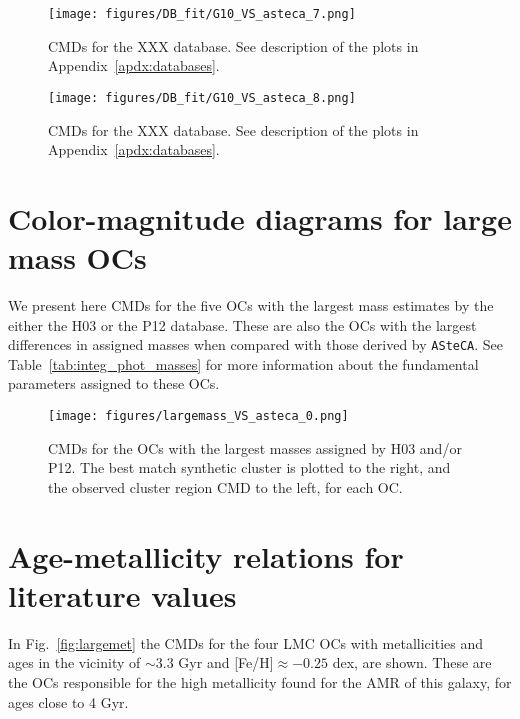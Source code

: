 \documentclass[a4paper,fleqn,usenatbib]{mnras}
\begin{document}
\begin{figure*}
\texttt{[image: figures/DB\_fit/G10\_VS\_asteca\_7.png]}
\caption{CMDs for the XXX database. See description of the plots in
Appendix~\ref{apdx:databases}.}
\label{fig:DBs_G10_7}
\end{figure*}

\begin{figure}
\texttt{[image: figures/DB\_fit/G10\_VS\_asteca\_8.png]}
\caption{CMDs for the XXX database. See description of the plots in
Appendix~\ref{apdx:databases}.}
\label{fig:DBs_G10_8}
\end{figure}





\section{Color-magnitude diagrams for large mass OCs}
\label{apdx:largemass}

We present here CMDs for the five OCs with the largest mass estimates by the
either the H03 or the P12 database. These are also the OCs with the largest
differences in assigned masses when compared with those derived by
\texttt{ASteCA}.
See Table~\ref{tab:integ_phot_masses} for more information about the fundamental
parameters assigned to these OCs.

\begin{figure*}
\texttt{[image: figures/largemass\_VS\_asteca\_0.png]}
\caption{CMDs for the OCs with the largest masses assigned by H03 and/or P12.
The best match synthetic cluster is plotted to the right, and the observed
cluster region CMD to the left, for each OC.}
\label{fig:largemass}
\end{figure*}





\section{Age-metallicity relations for literature values}
\label{apdx:amr_lit}

In Fig.~\ref{fig:largemet} the CMDs for the four LMC OCs with metallicities and
ages in the vicinity of ${\sim}3.3$ Gyr and [Fe/H]${\approx-0.25}$ dex, are
shown. These are the OCs responsible for the high metallicity found for the AMR
of this galaxy, for ages close to 4 Gyr.
\end{document}
